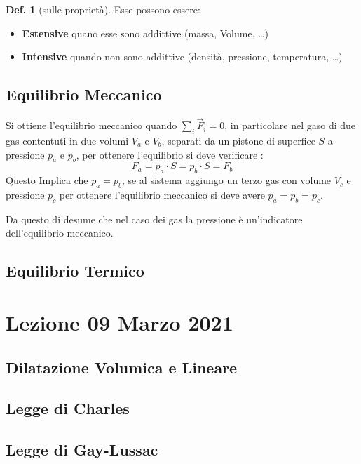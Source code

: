 \documentclass[a4paper]{article}
\theoremstyle{definition}
\newtheorem{defin}{Def.}
\theoremstyle{plain}
\newcommand {\bd} [1] {\textbf{#1}}
\begin{document}
\begin{defin}[sulle proprietà] Esse possono essere:
    \begin{itemize}
        \item \bd{Estensive} quano esse sono addittive (massa, Volume, \dots)
        \item \bd{Intensive} quando non sono addittive (densità, pressione, temperatura, \dots)
    \end{itemize}
\end{defin}

\subsection{Equilibrio Meccanico}

Si ottiene l'equilibrio meccanico quando $\sum_{i}\vec{F}_i=0$,
in particolare nel gaso di due gas contentuti in due volumi $V_a$ e $V_b$, separati da un pistone di superfice $S$ 
a pressione $p_a$ e $p_b$,
per ottenere l'equilibrio si deve verificare :
\begin{equation*}
    F_a = p_a \cdot S = p_b \cdot S = F_b
\end{equation*}
Questo Implica che $p_a=p_b$, se al sistema aggiungo un terzo gas con volume $V_c$ e pressione $p_c$
per ottenere l'equilibrio meccanico si deve avere $p_a=p_b=p_c$.

Da questo di desume che nel caso dei gas la pressione è un'indicatore dell'equilibrio meccanico.

\subsection{Equilibrio Termico}

\section{Lezione 09 Marzo 2021}

\subsection{Dilatazione Volumica e Lineare}

\subsection{Legge di Charles}

\subsection {Legge di Gay-Lussac}
\end{document}
